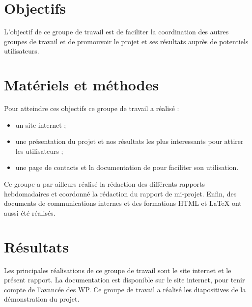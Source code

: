 \section{Objectifs}
L'objectif de ce groupe de travail est de faciliter la coordination des autres groupes de travail et de promouvoir le projet et ses résultats auprès de potentiels utilisateurs.

\section{Matériels et méthodes}
Pour atteindre ces objectifs ce groupe de travail a réalisé :
\begin{itemize}
  \item un site internet ;
  \item une présentation du projet et nos résultats les plus interessants pour attirer les utilisateurs ;
  \item une page de contacts et la documentation de \coquille{} pour faciliter son utilisation.
\end{itemize}

Ce groupe a par ailleurs réalisé la rédaction des différents rapports hebdomadaires et coordonné la rédaction du rapport de mi-projet. Enfin, des documents de communications internes et des formations HTML et \LaTeX{} ont aussi été réalisés.

\section{Résultats}
Les principales réalisations de ce groupe de travail sont le site internet et le présent rapport.
La documentation est disponible sur le site internet, pour tenir compte de l'avancée des WP. Ce groupe de travail a réalisé les diapositives de la démonstration du projet.
